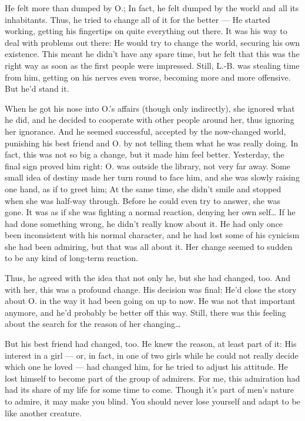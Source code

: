 He felt more than dumped by O.; In fact, he felt dumped by the world and all its inhabitants. Thus, he tried to change all of it for the better --- He started working, getting his fingertips on quite everything out there. It was his way to deal with problems out there: He would try to change the world, securing his own existence. 
This meant he didn't have any spare time, but he felt that this was the right way as soon as the first people were impressed. Still, L.-B. was stealing time from him, getting on his nerves even worse, becoming more and more offensive. 
But he'd stand it.

When he got his nose into O.'s affairs (though only indirectly), she ignored what he did, and he decided to cooperate with other people around her, thus ignoring her ignorance. And he seemed successful, accepted by the now-changed world, punishing his best friend and O. by not telling them what he was really doing. In fact, this was not so big a change, but it made him feel better. 
Yesterday, the final sign proved him right: O. was outside the library, not very far away. Some small idea of destiny made her turn round to face him, and she was slowly raising one hand, as if to greet him; At the same time, she didn't smile and stopped when she was half-way through. Before he could even try to answer, she was gone. It was as if she was fighting a normal reaction, denying her own self\dots{}
If he had done something wrong, he didn't really know about it. He had only once been inconsistent with his normal character, and he had lost some of his cynicism she had been admiring, but that was all about it. Her change seemed to sudden to be any kind of long-term reaction.

Thus, he agreed with the idea that not only he, but she had changed, too. And with her, this was a profound change. 
His decision was final: He'd close the story about O. in the way it had been going on up to now. He was not that important anymore, and he'd probably be better off this way. Still, there was this feeling about the search for the reason of her changing\dots{}

But his best friend had changed, too. He knew the reason, at least part of it: His interest in a girl --- or, in fact, in one of two girls while he could not really decide which one he loved --- had changed him, for he tried to adjust his attitude. He lost himself to become part of the group of admirers. 
For me, this admiration had had its share of my life for some time to come. Though it's part of men's nature to admire, it may make you blind. You should never lose yourself and adapt to be like another creature.


